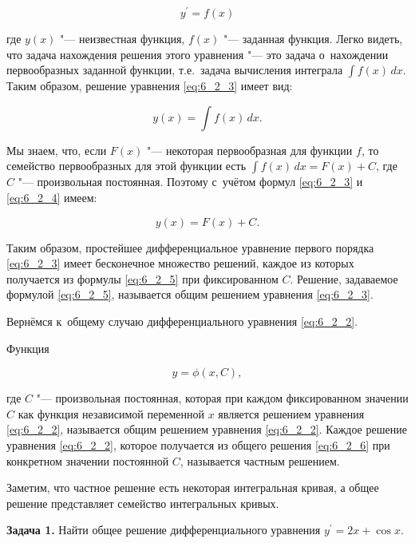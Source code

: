 \begin{equation}\label{eq:6_2_3}
y^\prime = f(x)
\end{equation}

\noindent
где $y(x)$ "--- неизвестная функция, $f(x)$ "--- заданная функция.
Легко видеть, что задача нахождения решения этого уравнения "--- это задача
о~нахождении первообразных заданной функции, т.е.\ задача вычисления интеграла
$\displaystyle \int f(x) \, dx$. Таким образом, решение уравнения \eqref{eq:6_2_3}
имеет вид:

\begin{equation}\label{eq:6_2_4}
y(x) = \int f(x) \, dx.
\end{equation}

Мы знаем, что, если $F(x)$ "--- некоторая первообразная для функции $f$, 
то семейство первообразных для этой функции есть
$\displaystyle \int f(x) \, dx = F(x) + C$, где $C$ "--- произвольная постоянная.
Поэтому с~учётом формул \eqref{eq:6_2_3} и \eqref{eq:6_2_4} имеем:

\begin{equation}\label{eq:6_2_5}
y(x) = F(x) + C.
\end{equation}

Таким образом, простейшее дифференциальное уравнение первого порядка \eqref{eq:6_2_3}
имеет бесконечное множество решений, каждое из которых получается из формулы
\eqref{eq:6_2_5} при фиксированном $C$. Решение, задаваемое формулой \eqref{eq:6_2_5},
называется общим решением уравнения \eqref{eq:6_2_3}.

Вернёмся к~общему случаю дифференциального уравнения \eqref{eq:6_2_2}.

Функция 

\begin{equation}\label{eq:6_2_6}
y = \phi(x, C),
\end{equation}

\noindent
где $C$ "--- произвольная постоянная, которая при каждом фиксированном значении $C$
как функция независимой переменной $x$ является решением уравнения \eqref{eq:6_2_2},
называется общим решением уравнения \eqref{eq:6_2_2}.
Каждое решение уравнения \eqref{eq:6_2_2}, которое получается из общего решения
\eqref{eq:6_2_6} при конкретном значении постоянной $C$, называется частным решением.

Заметим, что частное решение есть некоторая интегральная кривая, а общее решение
представляет семейство интегральных кривых.

\textbf{Задача 1.}\label{ex:6_2_1} Найти общее решение дифференциального уравнения
$y^\prime = 2x + \cos x$.

